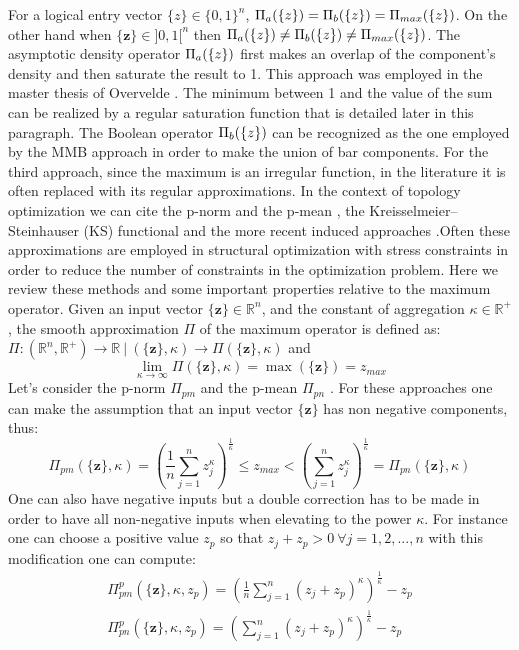 For a logical entry vector  $\lbrace{z}\rbrace\in \{0,1\}^n$, $\Pi_a(\left\{{z}\right\})=\Pi_b(\left\{{z}\right\})=  \Pi_{max}(\left\{{z}\right\})$. On the other hand when $\lbrace \mathbf{z}\rbrace \in ]0,1[^n$ then
$\Pi_a(\left\{{z}\right\})\neq\Pi_b(\left\{{z}\right\}) \neq  \Pi_{max}(\left\{{z}\right\})$. The asymptotic density operator $\Pi_a(\left\{{z}\right\})$ first makes an overlap of the component's density and then saturate the result to 1. This approach was employed in the master thesis of Overvelde \cite{overvelde2012moving}. The minimum between 1 and the value of the sum can be realized by a regular saturation function that is detailed later in this paragraph. The Boolean operator $\Pi_b(\left\{{z}\right\})$ can be recognized as the one employed by the MMB \cite{hoang2017topology} approach in order to make the union of bar components. For the third approach, since the maximum is an irregular function, in the literature it is often replaced with its regular approximations. In the context of topology optimization we can cite the p-norm and the p-mean \cite{duysinx1998new}, the Kreisselmeier–Steinhauser (KS) functional \cite{kreisselmeier1980systematic} and the more recent induced approaches \cite{kennedy2015improved}.Often these approximations are employed in structural optimization with stress constraints in order to reduce the number of constraints in the optimization problem.
Here we review these methods and some important properties relative to the maximum operator. Given an input vector $\lbrace \mathbf{z}\rbrace \in \mathbb{R}^n$, and the constant of aggregation $\kappa\in\mathbb{R}^+ $, the smooth approximation $\Pi$ of the maximum operator is defined as:
$\Pi: \left(\mathbb{R}^n,\mathbb{R}^{+} \right) \rightarrow \mathbb{R}\  | \  (\lbrace \mathbf{z}\rbrace,\kappa) \rightarrow \Pi(\lbrace \mathbf{z}\rbrace,\kappa)$  and
\begin{equation}
\label{eq:lp}
    \lim_{\kappa\to\infty}\Pi(\lbrace \mathbf{z}\rbrace,\kappa)=\max(\lbrace \mathbf{z}\rbrace)=z_{max}
\end{equation}
Let’s consider the p-norm $\Pi_{pm}$ and the p-mean $\Pi_{pn}$ \cite{duysinx1998new}.
For these approaches one can make the assumption that an input vector $\lbrace \mathbf{z}\rbrace$ has non negative components, thus:
\begin{equation}
    \Pi_{pm}(\lbrace \mathbf{z}\rbrace,\kappa)=\left(\frac{1}{n}\sum_{j=1}^n z_j^{\kappa}\right)^{\frac{1}{\kappa}}\leq z_{max} <\left(\sum_{j=1}^n z_j^{\kappa}\right)^{\frac{1}{\kappa}}=\Pi_{pn}(\lbrace \mathbf{z}\rbrace,\kappa)
\end{equation}
One can also have negative inputs but a double correction has to be made in order to have all non-negative inputs when elevating to the power $\kappa$. For instance one can choose a positive value $z_p$ so that $z_j+z_p>0\  \forall j=1,2,...,n$ with this modification one can compute: 
\begin{eqnarray}
   \Pi_{pm}^{p}(\lbrace \mathbf{z}\rbrace,\kappa,z_p)=\left(\frac{1}{n}\sum_{j=1}^n (z_j+z_p)^{\kappa}\right)^{\frac{1}{\kappa}}-z_p  \\
   \Pi_{pn}^{p}(\lbrace \mathbf{z}\rbrace,\kappa,z_p)=\left(\sum_{j=1}^n (z_j+z_p)^{\kappa}\right)^{\frac{1}{\kappa}}-z_p
\end{eqnarray}


